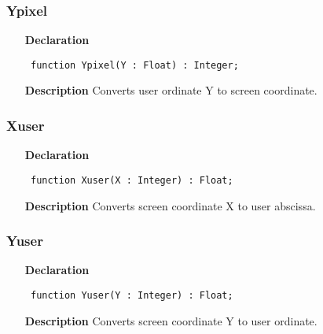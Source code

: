 \documentclass[12pt,a4paper,oneside]{report}
\newcommand{\declarationitem}[1]{\textbf{#1}}
\newcommand{\descriptiontitle}[1]{\textbf{#1}}
\newcommand{\code}[1]{\texttt{#1}}
\begin{document}
\subsubsection{Ypixel}
\label{uplot-Ypixel}
\begin{itemize}\item[\declarationitem{Declaration}\hfill]
	\begin{flushleft}
		\code{
			function Ypixel(Y : Float) : Integer;}
		
	\end{flushleft}
	
	\par
	\item[\descriptiontitle{Description}]
	Converts user ordinate Y to screen coordinate.
	
\end{itemize}
\subsubsection{Xuser}
\label{uplot-Xuser}
\begin{itemize}\item[\declarationitem{Declaration}\hfill]
	\begin{flushleft}
		\code{
			function Xuser(X : Integer) : Float;}
		
	\end{flushleft}
	
	\par
	\item[\descriptiontitle{Description}]
	Converts screen coordinate X to user abscissa.
	
\end{itemize}
\subsubsection{Yuser}
\label{uplot-Yuser}
\begin{itemize}\item[\declarationitem{Declaration}\hfill]
	\begin{flushleft}
		\code{
			function Yuser(Y : Integer) : Float;}
		
	\end{flushleft}
	
	\par
	\item[\descriptiontitle{Description}]
	Converts screen coordinate Y to user ordinate.
	
\end{itemize}
\end{document}
